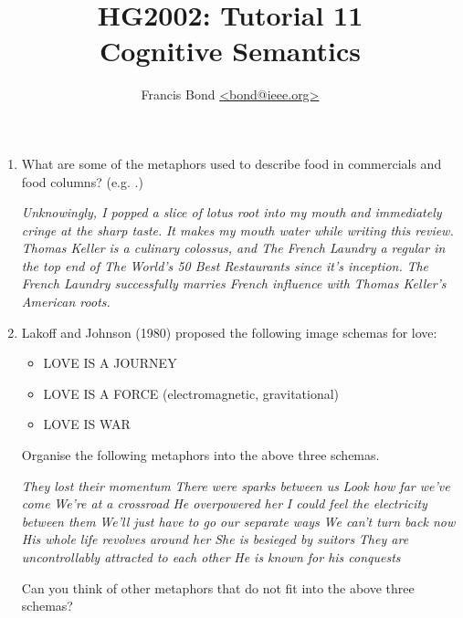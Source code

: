\documentclass[a4paper]{article}
\title{HG2002: Tutorial 11\\  Cognitive Semantics}
\author{Francis Bond \url{<bond@ieee.org>}}
\date{}%
\begin{document}
\maketitle



\begin{enumerate}
\item What are some of the metaphors used to describe food in
  commercials and food columns?  (e.g. .)
\begin{exe}
  \ex \textit{Unknowingly, I popped a slice of lotus root into my mouth and immediately cringe at the sharp taste.}
  \ex \textit{It makes my mouth water while writing this review.}
  \ex \textit{Thomas Keller is a culinary colossus, and The French Laundry a regular in the top end of The World’s 50 Best Restaurants since it’s inception.}
  \ex \textit{The French Laundry successfully marries French influence with Thomas Keller's American roots.}
\end{exe}
\item Lakoff and Johnson (1980) proposed the following image schemas for love:
  \begin{itemize}
  \item LOVE IS A JOURNEY
  \item LOVE IS A FORCE (electromagnetic, gravitational)
  \item LOVE IS WAR
  \end{itemize}
Organise the following metaphors into the above three schemas.
\begin{exe}
\ex \textit{They lost their momentum}
\ex \textit{There were sparks between us}
\ex \textit{Look how far we've come}
\ex \textit{We're at a crossroad}
\ex \textit{He overpowered her}
\ex \textit{I could feel the electricity between them}
\ex \textit{We'll just have to go our separate ways}
\ex \textit{We can't turn back now}
\ex \textit{His whole life revolves around her}
\ex \textit{She is besieged by suitors}
\ex \textit{They are uncontrollably attracted to each other}
\ex \textit{He is known for his conquests}
\end{exe}
Can you think of other metaphors that do not fit into the above three schemas?


\end{enumerate}
\end{document}
